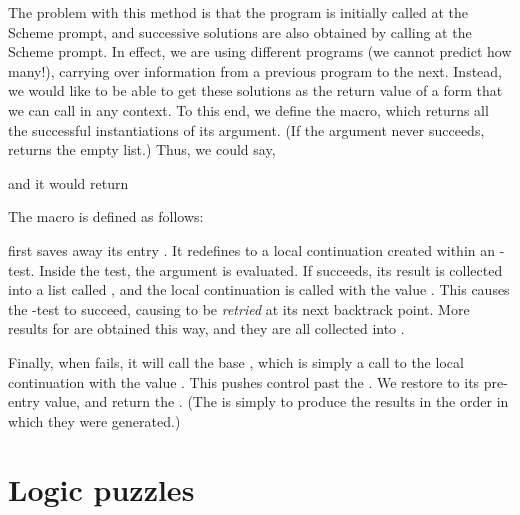 \n The problem with this method is that the program is
initially called at the Scheme prompt, and successive
solutions are also obtained by calling  at the Scheme
prompt.  In effect, we are using different programs (we
cannot predict how many!), carrying over information from a
previous program to the next.  Instead, we would like to be
able to get these solutions as the return value of a
form that we can call in any context.  To this end, we
define the
 macro, which returns all
the successful instantiations of its argument.  (If the argument
never succeeds,  returns the empty list.)
Thus, we could say,


\n and it would return


\n The  macro is defined as follows:


\n {} first saves away its entry .  It
redefines  to a local continuation  created within an
-test.  Inside the test, the  argument 
is evaluated.
If  succeeds, its result is collected
into a list called , and the local continuation
is called with the value .  This causes the
-test to succeed, causing  to be {\em retried} at its
next backtrack point.  More results for  are obtained this
way, and they are all collected into .

Finally, when  fails, it will call the base
, which is simply a call to the local
continuation with the value .  This pushes control
past the .   We restore  to
its  pre-entry value, and return the .  (The
 is simply to produce the results in the order
in which they were generated.)

\section{Logic puzzles}


